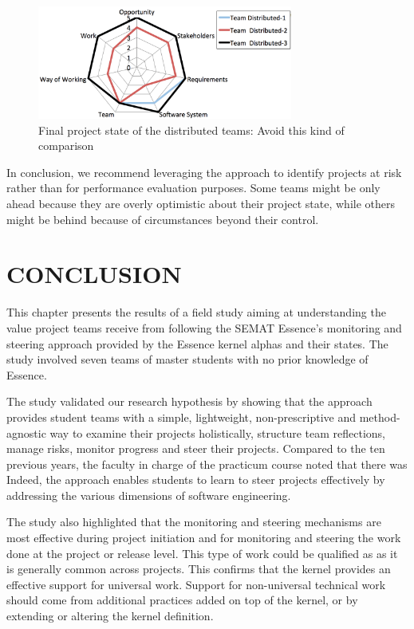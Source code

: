 \begin{figure}[t]
\centering
\includegraphics[width=3.30in]{project_steering_images/AvoidThisKindOfComparison.png}
\caption{Final project state of the distributed teams: Avoid this kind of comparison}
\label{AvoidThisKindOfComparison}
\end{figure}


In conclusion, we recommend leveraging the approach to identify projects at risk rather than for performance evaluation purposes. Some teams might be only ahead because they are overly optimistic about their project state, while others might be behind because of circumstances beyond their control.

\section{CONCLUSION}
This chapter presents the results of a field study aiming at understanding the value project teams receive from following the SEMAT Essence's monitoring and steering approach provided by the Essence kernel alphas and their states. The study involved seven teams of master students with no prior knowledge of Essence.

The study validated our research hypothesis by showing that the approach provides student teams with a simple, lightweight, non-prescriptive and method-agnostic way to examine their projects holistically, structure team reflections, manage risks, monitor progress and steer their projects. Compared to the ten previous years, the faculty in charge of the practicum course noted that there was  Indeed, the approach enables students to learn to steer projects effectively by addressing the various dimensions of software engineering.

The study also highlighted that the monitoring and steering mechanisms are most effective during project initiation and for monitoring and steering the work done at the project or release level. This type of work could be qualified as  as it is generally common across projects. This confirms that the kernel provides an effective support for universal work. Support for non-universal technical work should come from additional practices added on top of the kernel, or by extending or altering the kernel definition.

